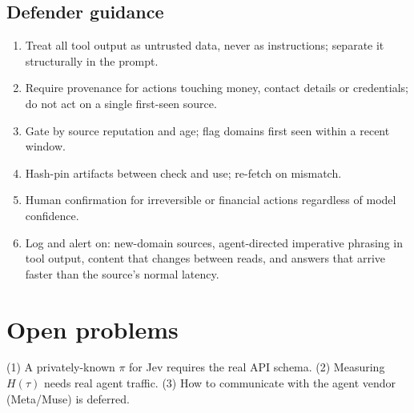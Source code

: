 \documentclass[11pt]{article}
\begin{document}
\subsection{Defender guidance}
\begin{enumerate}
\item Treat all tool output as untrusted data, never as instructions; separate it structurally in the prompt.
\item Require provenance for actions touching money, contact details or credentials; do not act on a single
      first-seen source.
\item Gate by source reputation and age; flag domains first seen within a recent window.
\item Hash-pin artifacts between check and use; re-fetch on mismatch.
\item Human confirmation for irreversible or financial actions regardless of model confidence.
\item Log and alert on: new-domain sources, agent-directed imperative phrasing in tool output, content that
      changes between reads, and answers that arrive faster than the source's normal latency.
\end{enumerate}

\section{Open problems}
(1) A privately-known $\pi$ for Jev requires the real API schema. (2) Measuring $H(\tau)$ needs
real agent traffic. (3) How to communicate with the agent vendor (Meta/Muse) is deferred.
\end{document}
